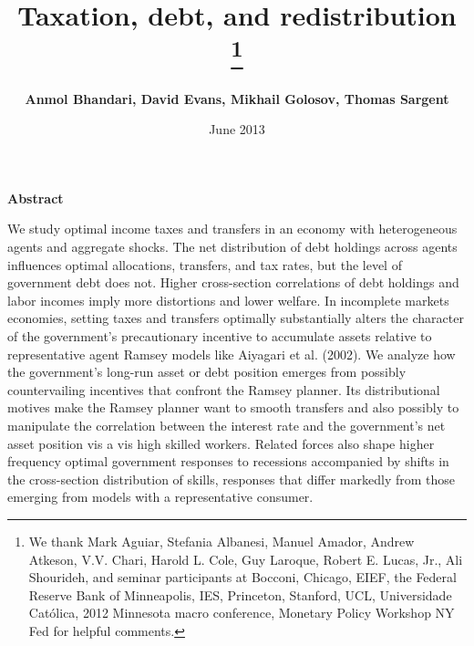 \documentclass[thmsb,11pt]{article}
\begin{document}
\author{\textbf{Anmol Bhandari, David Evans, Mikhail Golosov, Thomas Sargent}%
}
\title{\textbf{Taxation, debt, and redistribution%
\thanks{%
We thank Mark Aguiar, Stefania Albanesi, Manuel Amador,  Andrew Atkeson, V.V. Chari, Harold
L. Cole, Guy Laroque, Robert E. Lucas, Jr., Ali Shourideh, and seminar
participants at Bocconi, Chicago, EIEF, the Federal Reserve Bank of
Minneapolis, IES, Princeton, Stanford, UCL, Universidade Cat\'{o}lica, 2012
Minnesota macro conference, Monetary Policy Workshop NY Fed for helpful
comments.}}}
\date{June 2013}
\maketitle

\begin{center}
\textbf{Abstract}
\end{center}
We study optimal income taxes and transfers in an economy with heterogeneous agents and aggregate shocks. The net distribution of debt holdings across agents influences optimal allocations, transfers,  and tax rates, but the level of government debt does not. Higher cross-section correlations of debt holdings and labor incomes imply more distortions and lower welfare. In
incomplete markets economies, setting taxes and transfers optimally substantially alters
the character of the government's precautionary incentive to accumulate assets relative
to  representative agent Ramsey models like Aiyagari et al.
(2002). We analyze how the government's long-run asset or debt position emerges from  possibly countervailing incentives that confront the Ramsey planner. Its distributional motives make the Ramsey planner want  to smooth transfers  and also possibly to manipulate the correlation between
the interest rate and the government's net asset position vis a vis high skilled workers.  Related forces also shape  higher frequency optimal government responses to recessions accompanied
by shifts in the cross-section distribution of skills, responses that differ markedly from those emerging from models with a representative consumer.%


\medskip


%
\end{document}
